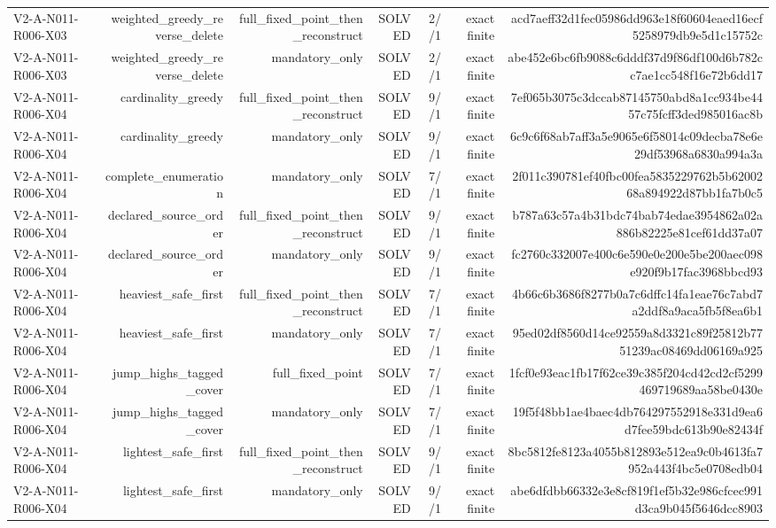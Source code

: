 {\begin{longtable}{lrrrrrr}
V2-A-N011-R006-X03 & weighted\_greedy\_reverse\_delete & full\_fixed\_point\_then\_reconstruct & SOLVED & 2//1 & exact finite & acd7aeff32d1fec05986dd963e18f60604eaed16ecf5258979db9e5d1c15752c \\
V2-A-N011-R006-X03 & weighted\_greedy\_reverse\_delete & mandatory\_only & SOLVED & 2//1 & exact finite & abe452e6bc6fb9088c6dddf37d9f86df100d6b782cc7ae1cc548f16e72b6dd17 \\
V2-A-N011-R006-X04 & cardinality\_greedy & full\_fixed\_point\_then\_reconstruct & SOLVED & 9//1 & exact finite & 7ef065b3075c3dccab87145750abd8a1cc934be4457c75fcff3ded985016ac8b \\
V2-A-N011-R006-X04 & cardinality\_greedy & mandatory\_only & SOLVED & 9//1 & exact finite & 6c9c6f68ab7aff3a5e9065e6f58014c09decba78e6e29df53968a6830a994a3a \\
V2-A-N011-R006-X04 & complete\_enumeration & mandatory\_only & SOLVED & 7//1 & exact finite & 2f011c390781ef40fbc00fea5835229762b5b6200268a894922d87bb1fa7b0c5 \\
V2-A-N011-R006-X04 & declared\_source\_order & full\_fixed\_point\_then\_reconstruct & SOLVED & 9//1 & exact finite & b787a63c57a4b31bdc74bab74edae3954862a02a886b82225e81cef61dd37a07 \\
V2-A-N011-R006-X04 & declared\_source\_order & mandatory\_only & SOLVED & 9//1 & exact finite & fc2760c332007e400c6e590e0e200e5be200aec098e920f9b17fac3968bbcd93 \\
V2-A-N011-R006-X04 & heaviest\_safe\_first & full\_fixed\_point\_then\_reconstruct & SOLVED & 7//1 & exact finite & 4b66c6b3686f8277b0a7c6dffc14fa1eae76c7abd7a2ddf8a9aca5fb5f8ea6b1 \\
V2-A-N011-R006-X04 & heaviest\_safe\_first & mandatory\_only & SOLVED & 7//1 & exact finite & 95ed02df8560d14ce92559a8d3321c89f25812b7751239ac08469dd06169a925 \\
V2-A-N011-R006-X04 & jump\_highs\_tagged\_cover & full\_fixed\_point & SOLVED & 7//1 & exact finite & 1fcf0e93eac1fb17f62ce39c385f204cd42cd2cf5299469719689aa58be0430e \\
V2-A-N011-R006-X04 & jump\_highs\_tagged\_cover & mandatory\_only & SOLVED & 7//1 & exact finite & 19f5f48bb1ae4baec4db764297552918e331d9ea6d7fee59bdc613b90e82434f \\
V2-A-N011-R006-X04 & lightest\_safe\_first & full\_fixed\_point\_then\_reconstruct & SOLVED & 9//1 & exact finite & 8bc5812fe8123a4055b812893e512ea9c0b4613fa7952a443f4bc5e0708edb04 \\
V2-A-N011-R006-X04 & lightest\_safe\_first & mandatory\_only & SOLVED & 9//1 & exact finite & abe6dfdbb66332e3e8cf819f1ef5b32e986cfcec991d3ca9b045f5646dcc8903 \\

\end{longtable}}
